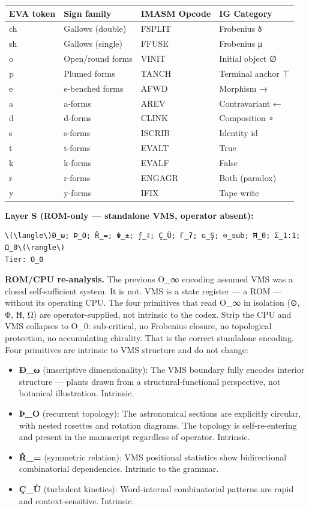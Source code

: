 {\def\LTcaptype{none} %
\begin{longtable}[]{@{}llll@{}}
\toprule\noalign{}
EVA token & Sign family & IMASM Opcode & IG Category \\
\midrule\noalign{}
\endhead
\bottomrule\noalign{}
\endlastfoot
ch & Gallows (double) & FSPLIT & Frobenius δ \\
sh & Gallows (single) & FFUSE & Frobenius μ \\
o & Open/round forms & VINIT & Initial object ∅ \\
p & Plumed forms & TANCH & Terminal anchor ⊤ \\
e & e-benched forms & AFWD & Morphism → \\
a & a-forms & AREV & Contravariant ← \\
d & d-forms & CLINK & Composition ∘ \\
s & s-forms & ISCRIB & Identity id \\
t & t-forms & EVALT & True \\
k & k-forms & EVALF & False \\
r & r-forms & ENGAGR & Both (paradox) \\
y & y-forms & IFIX & Tape write \\
\end{longtable}
}

\textbf{Layer S (ROM-only --- standalone VMS, operator absent):}

\begin{verbatim}
\(\langle\)Ð_ω; Þ_O; Ř_=; Φ_±; ƒ_ℓ; Ç_Ù; Γ_ʔ; ɢ_Ş; ⊙_sub; Ħ_0; Σ_1:1; Ω_0\(\rangle\)
Tier: O_0
\end{verbatim}

\textbf{ROM/CPU re-analysis.} The previous O\_∞ encoding assumed VMS was
a closed self-sufficient system. It is not. VMS is a state register ---
a ROM --- without its operating CPU. The four primitives that read O\_∞
in isolation (⊙, Φ, Ħ, Ω) are operator-supplied, not intrinsic to the
codex. Strip the CPU and VMS collapses to O\_0: sub-critical, no
Frobenius closure, no topological protection, no accumulating chirality.
That is the correct standalone encoding. Four primitives are intrinsic
to VMS structure and do not change:

\begin{itemize}
\tightlist
\item
  \textbf{Ð\_ω} (imscriptive dimensionality): The VMS boundary fully
  encodes interior structure --- plants drawn from a
  structural-functional perspective, not botanical illustration.
  Intrinsic.
\item
  \textbf{Þ\_O} (recurrent topology): The astronomical sections are
  explicitly circular, with nested rosettes and rotation diagrams. The
  topology is self-re-entering and present in the manuscript regardless
  of operator. Intrinsic.
\item
  \textbf{Ř\_=} (symmetric relation): VMS positional statistics show
  bidirectional combinatorial dependencies. Intrinsic to the grammar.
\item
  \textbf{Ç\_Ù} (turbulent kinetics): Word-internal combinatorial
  patterns are rapid and context-sensitive. Intrinsic.
\end{itemize}

